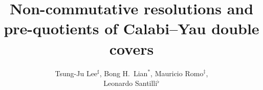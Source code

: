 \documentclass[12pt,a4paper,oneside]{amsart}
\numberwithin{equation}{section}
\theoremstyle{definition}
\theoremstyle{remark}
\begin{document}



{\linespread{1.1}
\title[NC resolutions and pre-quotients of CY double covers]{Non-commutative resolutions and pre-quotients of Calabi--Yau double covers}

\author[]{Tsung-Ju Lee$^{\sharp}$, Bong H.~Lian$^{\ast}$, Mauricio Romo$^{\ddag}$,\protect\\ Leonardo Santilli$^{\flat}$}
\address[]{$^{\sharp}$\small Department of Mathematics,\protect\\ \small National Cheng Kung University, Tainan, Taiwan.}
\address[]{$^{\ast,\ddag}$\small Center for Mathematics and Interdisciplinary Sciences,\protect\\ \small Fudan University, Shanghai,
200433, China.}
\address[]{$^{\ast,\ddag}$\small Shanghai Institute for Mathematics and Interdisciplinary Sciences (SIMIS),\protect\\ \small Shanghai,
200433, China.}
\address[]{$^{\ast}$\small Department of Mathematics,\protect\\ \small Brandeis University, Waltham, MA 02453, USA.}
\address[]{$^{\flat}$\small Yau Mathematical Sciences Center,\protect\\ \small Tsinghua University, Beijing, 100084, China.}


}
\end{document}

